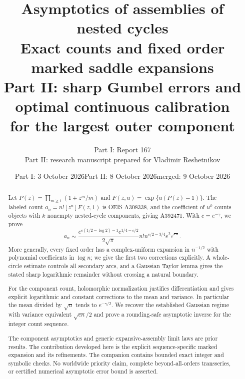 \documentclass[11pt,letterpaper]{article}
\title{Asymptotics of assemblies of nested cycles\\\large Exact counts and fixed order marked saddle expansions\\[6pt]\normalsize Part II: sharp Gumbel errors and optimal continuous calibration\\for the largest outer component}
\author{Part I: Report 167\\[2pt]Part II: research manuscript prepared for Vladimir Reshetnikov}
\date{Part I: 3 October 2026\quad Part II: 8 October 2026\quad merged: 9 October 2026}
\numberwithin{equation}{section}
\theoremstyle{remark}\newtheorem{remark}[theorem]{Remark}
\theoremstyle{definition}\newtheorem{definition}[theorem]{Definition}\theoremstyle{plain}
\begin{document}
\maketitle
\begin{abstract}
Let $P(z)=\prod_{m\geq1}(1+z^m/m)$ and
$F(z,u)=\exp\{u(P(z)-1)\}$. The labeled count
$a_n=n![z^n]F(z,1)$ is OEIS A308338, and the coefficient of $u^k$ counts
objects with $k$ nonempty nested-cycle components, giving A392471.
With $c=e^{-\gamma}$, we prove
\[
 a_n\sim \frac{e^{c(1/2-\log2)-1}c^{1/4-c/2}}{2\sqrt\pi}
             n!n^{c/2-3/4}e^{2\sqrt{cn}}.
\]
More generally, every fixed order has a complex-uniform expansion in
$n^{-1/2}$ with polynomial coefficients in $\log n$; we give the first
two corrections explicitly. A whole-circle estimate controls all
secondary arcs, and a Gaussian Taylor lemma gives the stated sharp
logarithmic remainder without crossing a natural boundary.

For the component count, holomorphic normalization justifies
differentiation and gives explicit logarithmic and constant corrections
to the mean and variance. In particular the mean divided by $\sqrt n$
tends to $e^{-\gamma/2}$. We recover the established Gaussian regime
with variance equivalent $\sqrt{cn}/2$ and prove a rounding-safe
asymptotic inverse for the integer count sequence.

The component asymptotics and generic expansive-assembly limit laws
are prior results. The contribution developed here is the explicit
sequence-specific marked expansion and its refinements. The companion
contains bounded exact integer and symbolic checks. No worldwide
priority claim, complete beyond-all-orders transseries, or certified
numerical asymptotic error bound is asserted.
\end{abstract}
\end{document}
